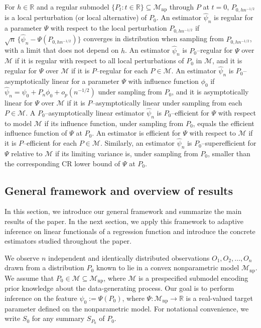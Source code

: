 \documentclass[11pt]{article}
\theoremstyle{definition}
\begin{document}
For $h \in \mathbb{R}$ and a regular submodel $\{P_t: t \in \mathbb{R}\} \subseteq \mathcal{M}_{\mathrm{np}}$ through $P$ at $t=0$, $P_{0,hn^{-1/2}}$ is a local perturbation (or local alternative) of $P_0$. An estimator $\widehat{\psi}_n$ is regular for a parameter $\Psi$ with respect to the local perturbation $P_{0,hn^{-1/2}}$ if $\sqrt{n}\,\{\widehat{\psi}_n - \Psi(P_{0,hn^{-1/2}})\}$ converges in distribution when sampling from $P_{0,hn^{-1/2}}$, with a limit that does not depend on $h$. An estimator $\widehat{\psi}_n$ is $P_0$--regular for $\Psi$ over $\mathcal{M}$ if it is regular with respect to all local perturbations of $P_0$ in $\mathcal{M}$, and it is regular for $\Psi$ over $\mathcal{M}$ if it is $P$--regular for each $P \in \mathcal{M}$. An estimator $\widehat{\psi}_n$ is $P_0$--asymptotically linear for a parameter $\Psi$ with influence function $\phi_0$ if $\widehat{\psi}_n = \psi_0 + P_n \phi_0 + o_p(n^{-1/2})$ under sampling from $P_0$, and it is asymptotically linear for $\Psi$ over $\mathcal{M}$ if it is $P$--asymptotically linear under sampling from each $P\in\mathcal{M}$. A $P_0$--asymptotically linear estimator $\widehat{\psi}_n$ is $P_0$--efficient for $\Psi$ with respect to model $\mathcal{M}$ if its influence function, under sampling from $P_0$, equals the efficient influence function of $\Psi$ at $P_0$. An estimator is efficient for $\Psi$ with respect to $\mathcal{M}$ if it is $P$--efficient for each $P \in \mathcal{M}$. Similarly, an estimator $\widehat{\psi}_n$ is $P_0$--superefficient for $\Psi$ relative to $\mathcal{M}$ if its limiting variance is, under sampling from $P_0$, smaller than the corresponding CR lower bound of $\Psi$ at $P_0$.


\subsection{General framework and overview of results}
\label{section::AMLEGeneral1}

In this section, we introduce our general framework and summarize the main results of the paper. In the next section, we apply this framework to adaptive inference on linear functionals of a regression function and introduce the concrete estimators studied throughout the paper.

We observe \(n\) independent and identically distributed observations \(O_1, O_2, \dots, O_n\) drawn from a distribution \(P_0\) known to lie in a convex nonparametric model \(\mathcal{M}_{\mathrm{np}}\). We assume that \(P_0 \in \mathcal{M} \subseteq \mathcal{M}_{\mathrm{np}}\), where \(\mathcal{M}\) is a prespecified submodel encoding prior knowledge about the data-generating process. Our goal is to perform inference on the feature \(\psi_0 := \Psi(P_0)\), where \(\Psi : \mathcal{M}_{\mathrm{np}} \to \mathbb{R}\) is a real-valued target parameter defined on the nonparametric model. For notational convenience, we write \(S_0\) for any summary \(S_{P_0}\) of \(P_0\).
\end{document}
